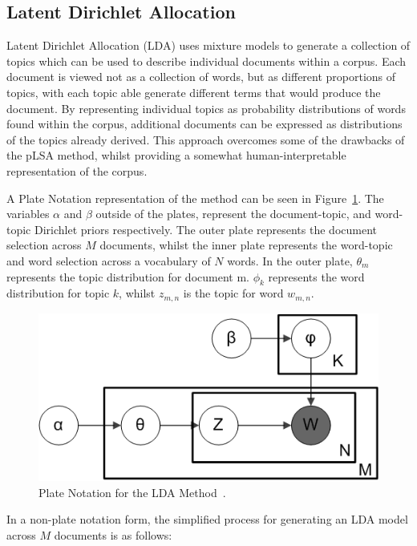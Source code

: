 \documentclass[10pt]{report}
\begin{document}
\subsection{Latent Dirichlet Allocation}
Latent Dirichlet Allocation (LDA) uses mixture models to generate a collection of topics which can be used to describe individual documents within a corpus. Each document is viewed not as a collection of words, but as different proportions of topics, with each topic able generate different terms that would produce the document. By representing individual topics as probability distributions of words found within the corpus, additional documents can be expressed as distributions of the topics already derived. This approach overcomes some of the drawbacks of the pLSA method, whilst providing a somewhat human-interpretable representation of the corpus.~\cite{Blei2003-dj}

A Plate Notation representation of the method can be seen in Figure~\ref{fig:lda_plate}. The variables $\alpha$ and $\beta$ outside of the plates, represent the document-topic, and word-topic Dirichlet priors respectively. The outer plate represents the document selection across $M$ documents, whilst the inner plate represents the word-topic and word selection across a vocabulary of $N$ words. In the outer plate, $\theta_m$ represents the topic distribution for document m. $\phi_k$ represents the word distribution for topic $k$, whilst $z_{m,n}$ is the topic for word $w_{m,n}$.

\begin {figure}[h!]
  \centering
  \includegraphics[scale=0.5]{lda_plate}
  \caption{Plate Notation for the LDA Method~\cite{Bkkbrad2018-yt}.
    \label{fig:lda_plate}}
\end{figure}

\renewcommand{\baselinestretch}{2.0}\normalsize
In a non-plate notation form, the simplified process for generating an LDA model across \(M\) documents is as follows:
\end{document}
